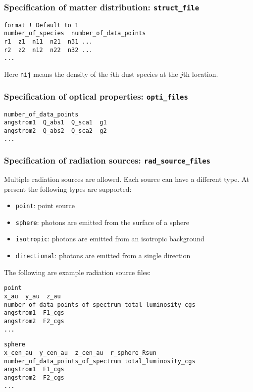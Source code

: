 \documentclass{article}
\newcommand{\cds}[1]{\texttt{#1}}
\begin{document}
\subsubsection{Specification of matter distribution: \cds{struct\_file}}

\begin{lstlisting}
format ! Default to 1
number_of_species  number_of_data_points
r1  z1  n11  n21  n31 ...
r2  z2  n12  n22  n32 ...
...
\end{lstlisting}
Here \cds{nij} means the density of the \(i\)th dust species at the \(j\)th location.

\subsubsection{Specification of optical properties: \cds{opti\_files}}

\begin{lstlisting}
number_of_data_points
angstrom1  Q_abs1  Q_sca1  g1
angstrom2  Q_abs2  Q_sca2  g2
...
\end{lstlisting}

\subsubsection{Specification of radiation sources: \cds{rad\_source\_files}}

Multiple radiation sources are allowed.  Each source can have a different type.  At present the following types are supported:
\begin{itemize}
  \item \cds{point}: point source
  \item \cds{sphere}: photons are emitted from the surface of a sphere
  \item \cds{isotropic}: photons are emitted from an isotropic background
  \item \cds{directional}: photons are emitted from a single direction
\end{itemize}
The following are example radiation source files:

\begin{lstlisting}
point
x_au  y_au  z_au
number_of_data_points_of_spectrum total_luminosity_cgs
angstrom1  F1_cgs
angstrom2  F2_cgs
...
\end{lstlisting}

\begin{lstlisting}
sphere
x_cen_au  y_cen_au  z_cen_au  r_sphere_Rsun
number_of_data_points_of_spectrum total_luminosity_cgs
angstrom1  F1_cgs
angstrom2  F2_cgs
...
\end{lstlisting}
\end{document}
